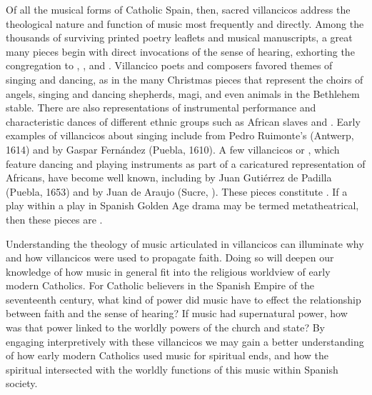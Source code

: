 Of all the musical forms of Catholic Spain, then, sacred villancicos address the theological nature and function of music most frequently and directly.
Among the thousands of surviving printed poetry leaflets and musical manuscripts, a great many pieces begin with direct invocations of the sense of hearing, exhorting the congregation to , , and .
Villancico poets and composers favored themes of singing and dancing, as in the many Christmas pieces that represent the choirs of angels, singing and dancing shepherds, magi, and even animals in the Bethlehem stable.
There are also representations of instrumental performance and characteristic dances of different ethnic groups such as African slaves and .
Early examples of villancicos about singing include  from Pedro Ruimonte's  (Antwerp, 1614) and  by Gaspar Fernández (Puebla, 1610).%
  \autocites[296--309]{Ruimonte:Parnaso}[240--244]{Fernandez:Cancionero}
A few  villancicos or , which feature dancing and playing instruments as part of a caricatured representation of Africans, have become well known, including  by Juan Gutiérrez de Padilla (Puebla, 1653) and  by Juan de Araujo (Sucre, ).%
  \autocites{Padilla:Tello}
    [Araujo ed. Robert Stevenson (1985) in][I:~655--668]{Burkholder:Anthology}
These pieces constitute .
If a play within a play in Spanish Golden Age drama may be termed metatheatrical, then these pieces are . %

Understanding the theology of music articulated in villancicos can illuminate why and how villancicos were used to propagate faith.
Doing so will deepen our knowledge of how music in general fit into the religious worldview of early modern Catholics.
For Catholic believers in the Spanish Empire of the seventeenth century, what kind of power did music have to effect the relationship between faith and the sense of hearing?
If music had supernatural power, how was that power linked to the worldly powers of the church and state? 
By engaging interpretively with these villancicos we may gain a better understanding of how early modern Catholics used music for spiritual ends, and how the spiritual intersected with the worldly functions of this music within Spanish society.

